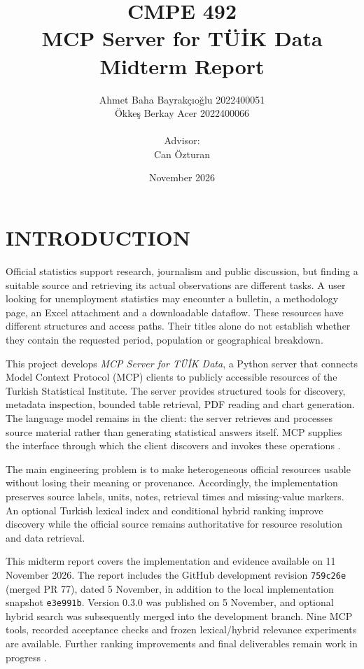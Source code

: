 \documentclass[a4paper,12pt]{report}
\newcommand{\tuik}{T\"U\.{I}K}
\newcommand{\code}[1]{\texttt{\small #1}}
\newcommand{\studentone}{Ahmet Baha Bayrakçıoğlu}
\newcommand{\studenttwo}{Ökkeş Berkay Acer}
\newcommand{\projectadvisor}{Can Özturan}
\begin{document}
\title{CMPE 492 \\ MCP Server for \tuik{} Data \\[0.5em] Midterm Report}
\author{\studentone{} \textbar{} 2022400051 \\ \studenttwo{} \textbar{} 2022400066 \\ \\ Advisor: \\ \projectadvisor}
\date{November 2026}
\hypersetup{pageanchor=false}
\maketitle
{}
\hypersetup{pageanchor=true}
\tableofcontents

\chapter{INTRODUCTION}
Official statistics support research, journalism and public discussion, but finding a suitable source and retrieving its actual observations are different tasks. A user looking for unemployment statistics may encounter a bulletin, a methodology page, an Excel attachment and a downloadable dataflow. These resources have different structures and access paths. Their titles alone do not establish whether they contain the requested period, population or geographical breakdown.

This project develops \emph{MCP Server for \tuik{} Data}, a Python server that connects Model Context Protocol (MCP) clients to publicly accessible resources of the Turkish Statistical Institute. The server provides structured tools for discovery, metadata inspection, bounded table retrieval, PDF reading and chart generation. The language model remains in the client: the server retrieves and processes source material rather than generating statistical answers itself. MCP supplies the interface through which the client discovers and invokes these operations \cite{mcp-tools}.

The main engineering problem is to make heterogeneous official resources usable without losing their meaning or provenance. Accordingly, the implementation preserves source labels, units, notes, retrieval times and missing-value markers. An optional Turkish lexical index and conditional hybrid ranking improve discovery while the official source remains authoritative for resource resolution and data retrieval.

This midterm report covers the implementation and evidence available on 11 November 2026. The report includes the GitHub development revision \code{759c26e} (merged PR 77), dated 5 November, in addition to the local implementation snapshot \code{e3e991b}. Version 0.3.0 was published on 5 November, and optional hybrid search was subsequently merged into the development branch. Nine MCP tools, recorded acceptance checks and frozen lexical/hybrid relevance experiments are available. Further ranking improvements and final deliverables remain work in progress \cite{project,acceptance,hybrid,release-record}.
\end{document}
